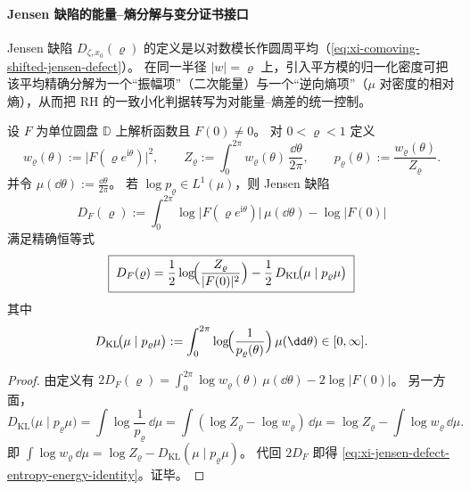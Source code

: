 \paragraph{Jensen 缺陷的能量--熵分解与变分证书接口}\label{par:xi-jensen-defect-entropy-energy-decomposition}
Jensen 缺陷 \(D_{\zeta,x_0}(\varrho)\) 的定义是以对数模长作圆周平均（\eqref{eq:xi-comoving-shifted-jensen-defect}）。
在同一半径 \(|w|=\varrho\) 上，引入平方模的归一化密度可把该平均精确分解为一个“振幅项”（二次能量）与一个“逆向熵项”（\(\mu\) 对密度的相对熵），从而把 RH 的一致小化判据转写为对能量--熵差的统一控制。

\begin{proposition}\label{prop:xi-jensen-defect-entropy-energy-identity}
设 \(F\) 为单位圆盘 \(\mathbb D\) 上解析函数且 \(F(0)\neq 0\)。
对 \(0<\varrho<1\) 定义
\[
w_\varrho(\theta):=\bigl|F(\varrho e^{\mathrm{i}\theta})\bigr|^2,\qquad
Z_\varrho:=\int_{0}^{2\pi} w_\varrho(\theta)\,\frac{\dd\theta}{2\pi},
\qquad
p_\varrho(\theta):=\frac{w_\varrho(\theta)}{Z_\varrho}.
\]
并令 \(\mu(\dd\theta):=\frac{\dd\theta}{2\pi}\)。
若 \(\log p_\varrho\in L^1(\mu)\)，则 Jensen 缺陷
\[
D_F(\varrho):=\int_{0}^{2\pi}\log\bigl|F(\varrho e^{\mathrm{i}\theta})\bigr|\,\mu(\dd\theta)-\log|F(0)|
\]
满足精确恒等式
\begin{equation}\label{eq:xi-jensen-defect-entropy-energy-identity}
\boxed{\;
D_F(\varrho)
=\frac12\log\!\Bigl(\frac{Z_\varrho}{|F(0)|^2}\Bigr)
-\frac12\,D_{\mathrm{KL}}\!\bigl(\mu\mid p_\varrho\mu\bigr)\;}
\end{equation}
其中
\[
D_{\mathrm{KL}}\!\bigl(\mu\mid p_\varrho\mu\bigr)
:=\int_{0}^{2\pi}\log\!\Bigl(\frac{1}{p_\varrho(\theta)}\Bigr)\,\mu(\dd\theta)
\in[0,\infty].
\]
\end{proposition}

\begin{proof}
由定义有
\(
2D_F(\varrho)=\int_0^{2\pi}\log w_\varrho(\theta)\,\mu(\dd\theta)-2\log|F(0)|
\)。
另一方面，
\[
D_{\mathrm{KL}}\!\bigl(\mu\mid p_\varrho\mu\bigr)
=\int \log\frac{1}{p_\varrho}\,\dd\mu
=\int (\log Z_\varrho-\log w_\varrho)\,\dd\mu
=\log Z_\varrho-\int\log w_\varrho\,\dd\mu.
\]
即 \(\int\log w_\varrho\,\dd\mu=\log Z_\varrho-D_{\mathrm{KL}}(\mu\mid p_\varrho\mu)\)。
代回 \(2D_F\) 即得 \eqref{eq:xi-jensen-defect-entropy-energy-identity}。证毕。
\end{proof}

